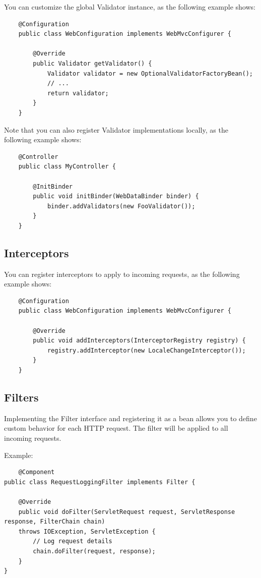 \documentclass{scrartcl}
\begin{document}
You can customize the global Validator instance, as the following example shows:

\begin{lstlisting}
    @Configuration
    public class WebConfiguration implements WebMvcConfigurer {

        @Override
        public Validator getValidator() {
            Validator validator = new OptionalValidatorFactoryBean();
            // ...
            return validator;
        }
    }
\end{lstlisting}

Note that you can also register Validator implementations locally, as the following example shows:

\begin{lstlisting}
    @Controller
    public class MyController {

        @InitBinder
        public void initBinder(WebDataBinder binder) {
            binder.addValidators(new FooValidator());
        }
    }

\end{lstlisting}

\subsection{Interceptors}

You can register interceptors to apply to incoming requests, as the following example shows:

\begin{lstlisting}
    @Configuration
    public class WebConfiguration implements WebMvcConfigurer {

        @Override
        public void addInterceptors(InterceptorRegistry registry) {
            registry.addInterceptor(new LocaleChangeInterceptor());
        }
    }
\end{lstlisting}

\subsection{Filters}

Implementing the Filter interface and registering it as a bean allows you to define custom behavior for each HTTP request. The filter will be applied to all incoming requests.

Example:


\begin{lstlisting}
    @Component
public class RequestLoggingFilter implements Filter {

    @Override
    public void doFilter(ServletRequest request, ServletResponse response, FilterChain chain)
    throws IOException, ServletException {
        // Log request details
        chain.doFilter(request, response);
    }
}
\end{lstlisting}
\end{document}
